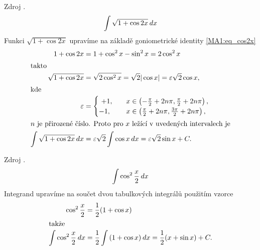       \begin{example}
        Zdroj \cite[s.~30]{Knichal}.
        \begin{equation}\label{MA:int_ex_04}
          \int{\sqrt{1+\cos2x}\hspace{2pt}dx}
        \end{equation}
        Funkci $\sqrt{1+\cos2x}$ upravíme na základě goniometrické identity \ref{MA1:eq_cos2x}
        \begin{align*}
          1+\cos2x       &= 1+\cos^2x-\sin^2x=2\cos^2x                                         \\
          \shortintertext{takto}
          \sqrt{1+\cos2x}&=\sqrt{2\cos^2x} = \sqrt{2}|\cos x| = \varepsilon\sqrt{2}\cos x,     \\
          \shortintertext{kde}
          \varepsilon &=
            \begin{cases} 
             +1, &  x\in \left(-\frac{\pi}{2}+2n\pi,\frac{\pi}{2}+2n\pi\right), \\
             -1, &  x\in \left(\frac{\pi}{2}+2n\pi,\frac{3\pi}{2}+2n\pi\right),
            \end{cases}                                                                        \\
          \intertext{$n$ je přirozené číslo. Proto pro $x$ ležící v uvedených intervalech je}
          \int\sqrt{1+\cos2x}\dx & = \varepsilon\sqrt{2}\int\cos x\dx 
                                   = \varepsilon\sqrt{2}\sin x + C.
        \end{align*}
      \end{example}
      
      \begin{example}
        Zdroj \cite[s.~30]{Knichal}.
        \begin{equation}\label{MA:int_ex_05}
          \int\cos^2\frac{x}{2}\hspace{2pt}dx
        \end{equation}
        Integrand upravíme na součet dvou tabulkových integrálů použitím vzorce
        \begin{align*}
          \cos^2\frac{x}{2} &= \frac{1}{2}(1+\cos x)     \\ 
          \shortintertext{takže}
          \int{\cos^2\frac{x}{2}}\hspace{2pt}dx 
                            &= \frac{1}{2}\int{(1+\cos x)}\hspace{2pt}dx = \frac{1}{2}(x+\sin x) + C.
        \end{align*}          
      \end{example}
      
